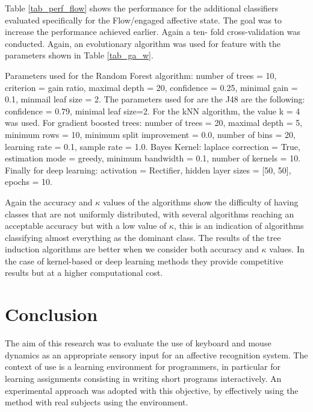 \documentclass[a4paper,twoside]{article}
\begin{document}
Table \ref{tab_perf_flow} shows the performance for the additional classifiers
evaluated specifically for the Flow/engaged affective state. The goal was to
increase the performance achieved earlier. Again a ten-
fold cross-validation was conducted. Again, an evolutionary algorithm was used for feature with the parameters shown in Table \ref{tab_ga_w}.

      Parameters
used for the Random Forest algorithm: number of trees = 10, 
criterion = gain ratio, maximal depth = 20, 
confidence = 0.25, minimal gain = 0.1, minmail leaf size = 2.  The
parameters used for are the J48 are the following:  confidence = 0.79, minimal
leaf size=2. For the kNN algorithm, the value k = 4 was used. 
For gradient boosted
trees: number of trees = 20,  maximal depth = 5, minimum rows = 10, 
minimum split 
improvement = 0.0, number of bins = 20, 
learning rate = 0.1, sample rate = 1.0.  Bayes
Kernel: laplace correction = True, estimation mode = greedy, 
minimum bandwidth = 0.1, number of kernels = 10.  Finally for deep learning: activation = Rectifier, hidden layer sizes = [50, 50], epochs = 10. 


Again the accuracy and $\kappa$ values of the
algorithms show the difficulty of having classes that are not uniformly
distributed, with several algorithms reaching an acceptable accuracy but with a
low value of  $\kappa$, this is an indication of algorithms classifying almost
everything as the dominant class. The results of the tree induction algorithms
are better when we consider both accuracy and  $\kappa$ values. In the case of
kernel-based or deep learning methods they provide competitive results but at a
higher computational cost.
 

\section{Conclusion}

The aim of this research was to evaluate the use of keyboard and mouse dynamics
as an appropriate sensory input for an affective recognition system. The context
of use is a learning environment for programmers, in particular for learning
assignments consisting in writing short programs interactively. An experimental
approach was adopted with this objective, by effectively using the
method with real subjects using the environment.
\end{document}
